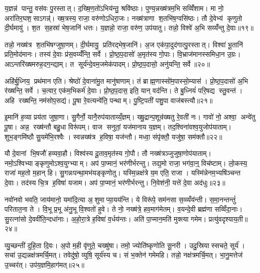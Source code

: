 य॒ज्ञन्न॑ पान्तु॒ वस॑वः पु॒रस्तात्। द॒ख्षि॒ण॒तो॑ऽभिय॑न्तु॒ श्रवि॑ष्ठाः। पुण्य॒न्नख्ष॑त्रम॒भि सव्विँ॑शाम। मा नो॒ अरा॑तिर॒घश॒साऽगन्न्॑। ख्ष॒त्रस्य॒ राजा॒ वरु॑णोऽधिरा॒जः। नख्ष॑त्राणा श॒तभि॑ष॒ग्वसि॑ष्ठः। तौ दे॒वेभ्य॑ कृणुतो दी॒र्घमायु॑। श॒त स॒हस्रा॑ भेष॒जानि॑ धत्तः। य॒ज्ञन्नो॒ राजा॒ वरु॑ण॒ उप॑यातु। तन्नो॒ विश्वे॑ अ॒भि सय्यँ॑न्तु दे॒वाः॥१९॥

तन्नो॒ नख्ष॑त्र श॒तभि॑षग्जुषा॒णम्। दी॒र्घमायु॒ प्रति॑रद्भेष॒जानि॑। अ॒ज एक॑पा॒दुद॑गात्पु॒रस्तात्। विश्वा॑ भू॒तानि॑ प्रति॒मोद॑मानः। तस्य॑ दे॒वाः प्र॑स॒वय्यँ॑न्ति॒ सर्वे। प्रो॒ष्ठ॒प॒दासो॑ अ॒मृत॑स्य गो॒पाः। वि॒भ्राज॑मानस्समिधा॒न उ॒ग्रः। आऽन्तरि॑ख्षमरुह॒दग॒न्द्याम्। त सूर्य॑न्दे॒वम॒जमेक॑पादम्। प्रो॒ष्ठ॒प॒दासो॒ अनु॑यन्ति॒ सर्वे॥२०॥

अहि॑र्बु॒ध्निय॒ प्रथ॑मान एति। श्रेष्ठो॑ दे॒वाना॑मु॒त मानु॑षाणाम्। तं ब्राह्म॒णास्सो॑म॒पास्सो॒म्यास॑। प्रो॒ष्ठ॒प॒दासो॑ अ॒भि र॑ख्षन्ति॒ सर्वे। च॒त्वार॒ एक॑म॒भिकर्म॑ दे॒वाः। प्रो॒ष्ठ॒प॒दास॒ इति॒ यान् वद॑न्ति। ते बु॒ध्नियं॑ परि॒षद्य स्तु॒वन्त॑। अहि रख्षन्ति॒ नम॑सोप॒सद्य॑। पू॒षा रे॒वत्यन्वे॑ति॒ पन्थाम्। पु॒ष्टि॒पती॑ पशु॒पा वाज॑बस्त्यौ॥२१॥

इ॒मानि॑ ह॒व्या प्रय॑ता जुषा॒णा। सु॒गैर्नो॒ यानै॒रुप॑याताय्यँ॒ज्ञम्। ख्षु॒द्रान्प॒शून्र॑ख्षतु रे॒वती॑ नः। गावो॑ नो॒ अश्वा॒ अन्वे॑तु पू॒षा। अन्न॒ रख्ष॑न्तौ बहु॒धा विरू॑पम्। वाज सनुतां॒ यज॑मानाय य॒ज्ञम्। तद॒श्विना॑वश्व॒युजोप॑याताम्। शुभ॒ङ्गमि॑ष्ठौ सु॒यमे॑भि॒रश्वैः। स्वन्नख्ष॑त्र ह॒विषा॒ यज॑न्तौ। मध्वा॒ संपृ॑क्तौ॒ यजु॑षा॒ सम॑क्तौ॥२२॥

यौ दे॒वानां भि॒षजौ॑ हव्यवा॒हौ। विश्व॑स्य दू॒ताव॒मृत॑स्य गो॒पौ। तौ नख्ष॑त्रञ्जुजुषा॒णोप॑याताम्। नमो॒ऽश्विभ्याङ्कृणुमोऽश्व॒युग्भ्याम्। अप॑ पा॒प्मानं॒ भर॑णीर्भरन्तु। तद्य॒मो राजा॒ भग॑वा॒न्॒ विच॑ष्टाम्। लो॒कस्य॒ राजा॑ मह॒तो म॒हान् हि। सु॒गन्नःपन्था॒मभ॑यङ्कृणोतु। यस्मि॒न्नक्ष॑त्रे य॒म एति॒ राजा। यस्मि॑न्नेनम॒भ्यषि॑ञ्चन्त दे॒वाः। तद॑स्य चि॒त्र ह॒विषा॑ यजाम। अप॑ पा॒प्मानं॒ भर॑णीर्भरन्तु। नि॒वेश॑नी॒ यत्ते॑ दे॒वा अद॑धुः॥२३॥\anuvakamend[त॒तार॒ मह्यं॑ प्रास॒चीर्या यान्तु य॒ज्ञव्वाँच स्व॒स्ति दे॒वा अनु॑यन्ति॒ सर्वे॒ वाज॑बस्त्यौ॒ सम॑क्तौ दे॒वास्त्रीणि॑ च]

नवो॑नवो भवति॒ जाय॑मानो॒ यमा॑दि॒त्या अ॒शुमाप्या॒यय॑न्ति। ये विरू॑पे॒ सम॑नसा स॒व्व्यँय॑न्ती। स॒मा॒नन्तन्तुं॑ परितात॒ना ते। वि॒भू प्र॒भू अ॑नु॒भू वि॒श्वतो॑ हुवे। ते नो॒ नख्ष॑त्रे॒ हव॒माग॑मेतम्। व॒यन्दे॒वी ब्रह्म॑णा सव्विँदा॒नाः। सु॒रत्ना॑सो दे॒ववी॑ति॒न्दधा॑नाः। अ॒हो॒रा॒त्रे ह॒विषा॑ व॒र्धय॑न्तः। अति॑ पा॒प्मान॒मति॑ मुक्त्या गमेम। प्रत्यु॑वदृश्याय॒ती॥२४॥

व्यु॒च्छन्ती॑ दुहि॒ता दि॒वः। अ॒पो म॒ही वृ॑णुते॒ चख्षु॑षा। तमो॒ ज्योति॑ष्कृणोति सू॒नरी। उदु॒स्रियास्सचते॒ सूर्य॑। सचा॑ उ॒द्यन्नक्ष॑त्रमर्चि॒मत्। तवेदु॑षो॒ व्युषि॒ सूर्य॑स्य च। सं भ॒क्तेन॑ गमेमहि। तन्नो॒ नक्ष॑त्रमर्चि॒मत्। भा॒नु॒मत्तेज॑ उ॒च्चर॑त्। उप॑य॒ज्ञमि॒हाग॑मत्॥२५॥

